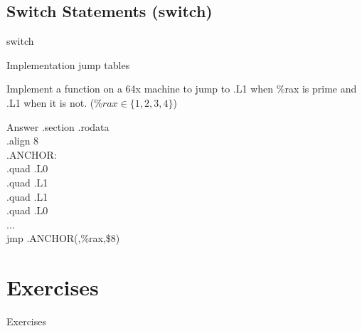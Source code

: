 \documentclass{beamer}
\begin{document}
        \subsection{Switch Statements (switch)}
            \begin{frame}{switch}
                \begin{block}{Implementation}
                    jump tables
                \end{block}
                \begin{example}
                    Implement a function on a 64x machine to jump to .L1 when \%rax is prime and .L1 when it is not. ($\%rax \in \{1,2,3,4\}$) 
                \end{example}
                \begin{block}{Answer}
                    .section .rodata\\
                    .align 8\\
                    .ANCHOR:\\
                    .quad .L0\\
                    .quad .L1\\
                    .quad .L1\\
                    .quad .L0\\
                    ...\\
                    jmp .ANCHOR(,\%rax,\$8)
                \end{block}
            \end{frame}
    \section{Exercises}
        \begin{frame}{Exercises}
            
        \end{frame}
\end{document}
